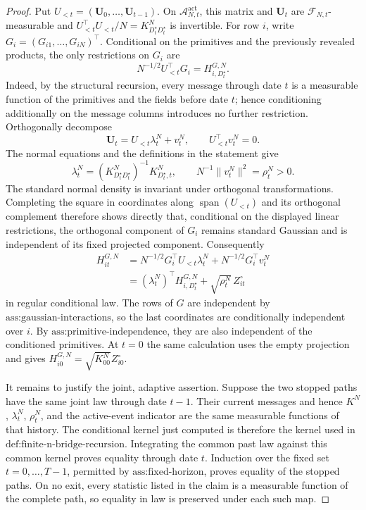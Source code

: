 \documentclass{article}
\begin{document}
\begin{proof}
Put \(U_{<t}=(\mathbf U_0,\ldots,\mathbf U_{t-1})\).  On \(\mathcal A_{N,t}^{\mathrm{act}}\), this matrix and \(\mathbf U_t\) are \(\mathscr F_{N,t}\)-measurable and \(U_{<t}^{\top}U_{<t}/N=K^N_{D_t^{\star}D_t^{\star}}\) is invertible.  For row \(i\), write \(G_i=(G_{i1},\ldots,G_{iN})^{\top}\).  Conditional on the primitives and the previously revealed products, the only restrictions on \(G_i\) are
\[
 N^{-1/2}U_{<t}^{\top}G_i=H^{G,N}_{i,D_t^{\star}}.
\]
Indeed, by the structural recursion, every message through date \(t\) is a measurable function of the primitives and the fields before date \(t\); hence conditioning additionally on the message columns introduces no further restriction.  Orthogonally decompose
\[
 \mathbf U_t=U_{<t}\lambda_t^N+v_t^N,
 \qquad U_{<t}^{\top}v_t^N=0.
\]
The normal equations and the definitions in the statement give
\[
 \lambda_t^N=(K^N_{D_t^{\star}D_t^{\star}})^{-1}K^N_{D_t^{\star},t},
 \qquad N^{-1}\|v_t^N\|^2=\rho_t^N>0.
\]
The standard normal density is invariant under orthogonal transformations.  Completing the square in coordinates along \(\operatorname{span}(U_{<t})\) and its orthogonal complement therefore shows directly that, conditional on the displayed linear restrictions, the orthogonal component of \(G_i\) remains standard Gaussian and is independent of its fixed projected component.  Consequently
\[
 \begin{aligned}
 H_{it}^{G,N}
 &=N^{-1/2}G_i^{\top}U_{<t}\lambda_t^N+N^{-1/2}G_i^{\top}v_t^N\\
 &=(\lambda_t^N)^{\top}H^{G,N}_{i,D_t^{\star}}+\sqrt{\rho_t^N}\,Z_{it}^{\circ}
 \end{aligned}
\]
in regular conditional law.  The rows of \(G\) are independent by \(\text{ass:gaussian-interactions}\), so the last coordinates are conditionally independent over \(i\).  By \(\text{ass:primitive-independence}\), they are also independent of the conditioned primitives.  At \(t=0\) the same calculation uses the empty projection and gives \(H_{i0}^{G,N}=\sqrt{K_{00}^N}Z_{i0}^{\circ}\).

It remains to justify the joint, adaptive assertion.  Suppose the two stopped paths have the same joint law through date \(t-1\).  Their current messages and hence \(K^N\), \(\lambda_t^N\), \(\rho_t^N\), and the active-event indicator are the same measurable functions of that history.  The conditional kernel just computed is therefore the kernel used in \(\text{def:finite-n-bridge-recursion}\).  Integrating the common past law against this common kernel proves equality through date \(t\).  Induction over the fixed set \(t=0,\ldots,T-1\), permitted by \(\text{ass:fixed-horizon}\), proves equality of the stopped paths.  On no exit, every statistic listed in the claim is a measurable function of the complete path, so equality in law is preserved under each such map.
\end{proof}
\end{document}
